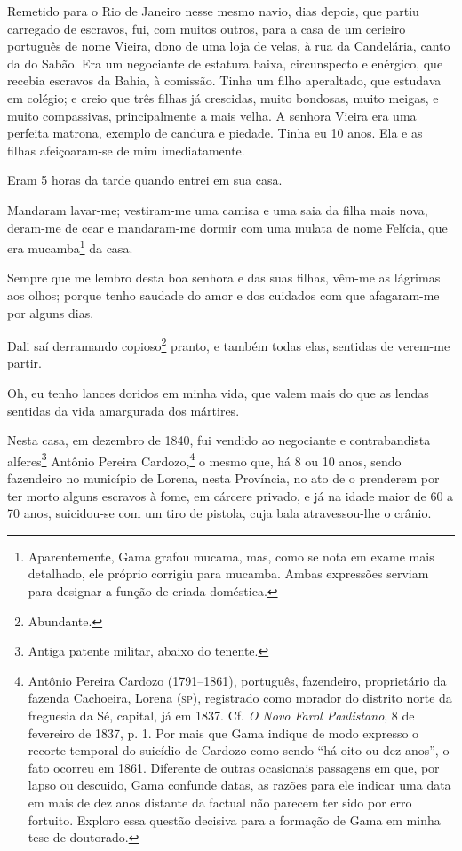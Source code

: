 Remetido para o Rio de Janeiro nesse mesmo navio, dias depois, que
partiu carregado de escravos, fui, com muitos outros, para a casa de um
cerieiro português de nome Vieira, dono de uma loja de velas, à rua da
Candelária, canto da do Sabão. Era um negociante de estatura baixa,
circunspecto e enérgico, que recebia escravos da Bahia, à comissão.
Tinha um filho aperaltado, que estudava em colégio; e creio que três
filhas já crescidas, muito bondosas, muito meigas, e muito compassivas,
principalmente a mais velha. A senhora Vieira era uma perfeita matrona,
exemplo de candura e piedade. Tinha eu 10 anos. Ela e as filhas
afeiçoaram-se de mim imediatamente.

Eram 5 horas da tarde quando entrei em sua casa.

Mandaram lavar-me; vestiram-me uma camisa e uma saia da filha mais nova,
deram-me de cear e mandaram-me dormir com uma mulata de nome Felícia,
que era mucamba\footnote{Aparentemente, Gama grafou mucama, mas, como
  se nota em exame mais detalhado, ele próprio corrigiu para mucamba.
  Ambas expressões serviam para designar a função de criada doméstica.}
da casa.

Sempre que me lembro desta boa senhora e das suas filhas, vêm-me as
lágrimas aos olhos; porque tenho saudade do amor e dos cuidados com que
afagaram-me por alguns dias.

Dali saí derramando copioso\footnote{Abundante.} pranto, e também
todas elas, sentidas de verem-me partir.

Oh, eu tenho lances doridos em minha vida, que valem mais do que as
lendas sentidas da vida amargurada dos mártires.

Nesta casa, em dezembro de 1840, fui vendido ao negociante e
contrabandista alferes\footnote{Antiga patente militar, abaixo do
  tenente.} Antônio Pereira Cardozo,\footnote{Antônio Pereira Cardozo \label{cardozo}
  (1791--1861), português, fazendeiro, proprietário da fazenda Cachoeira,
  Lorena (\textsc{sp}), registrado como morador do distrito norte da freguesia da
  Sé, capital, já em 1837. Cf. \emph{O Novo Farol Paulistano},
  8 de fevereiro de 1837, p. 1. Por mais que Gama indique de modo expresso o
  recorte temporal do suicídio de Cardozo como sendo ``há oito ou dez
  anos'', o fato ocorreu em 1861. Diferente de outras ocasionais
  passagens em que, por lapso ou descuido, Gama confunde datas, as razões
  para ele indicar uma data em mais de dez anos distante da factual não
  parecem ter sido por erro fortuito. Exploro essa questão decisiva para
  a formação de Gama em minha tese de doutorado.} o mesmo que, há 8 ou %
10 anos, sendo fazendeiro no município de Lorena, nesta Província, no
ato de o prenderem por ter morto alguns escravos à fome, em cárcere
privado, e já na idade maior de 60 a 70 anos, suicidou-se com um tiro de
pistola, cuja bala atravessou-lhe o crânio.

